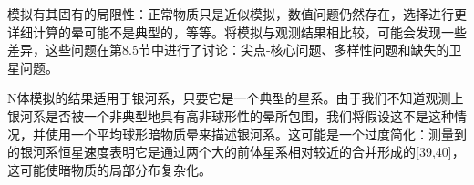 模拟有其固有的局限性：正常物质只是近似模拟，数值问题仍然存在，选择进行更详细计算的晕可能不是典型的，等等。将模拟与观测结果相比较，可能会发现一些差异，这些问题在第8.5节中进行了讨论：尖点-核心问题、多样性问题和缺失的卫星问题。

N体模拟的结果适用于银河系，只要它是一个典型的星系。由于我们不知道观测上银河系是否被一个非典型地具有高非球形性的晕所包围，我们将假设这不是这种情况，并使用一个平均球形暗物质晕来描述银河系。这可能是一个过度简化：测量到的银河系恒星速度表明它是通过两个大的前体星系相对较近的合并形成的[39,40]，这可能使暗物质的局部分布复杂化。





 



